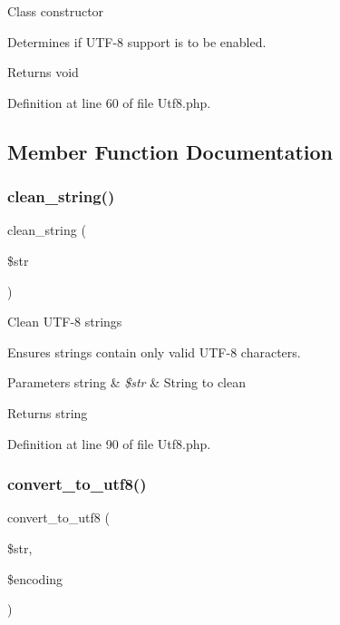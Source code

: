 Class constructor

Determines if U\+T\+F-\/8 support is to be enabled.

\begin{DoxyReturn}{Returns}
void 
\end{DoxyReturn}


Definition at line 60 of file Utf8.\+php.



\subsection{Member Function Documentation}
\mbox{\label{class_c_i___utf8_af9fc6214803042dd0b46d6ac5bdb4b7b}} 
\subsubsection{\texorpdfstring{clean\_string()}{clean\_string()}}
{\footnotesize\ttfamily clean\+\_\+string (\begin{DoxyParamCaption}\item[{}]{\$str }\end{DoxyParamCaption})}

Clean U\+T\+F-\/8 strings

Ensures strings contain only valid U\+T\+F-\/8 characters.


\begin{DoxyParams}[1]{Parameters}
string & {\em \$str} & String to clean \\
\hline
\end{DoxyParams}
\begin{DoxyReturn}{Returns}
string 
\end{DoxyReturn}


Definition at line 90 of file Utf8.\+php.

\mbox{\label{class_c_i___utf8_a7f6a8b9f00d7d11b23abcadfc91e9583}} 
\subsubsection{\texorpdfstring{convert\_to\_utf8()}{convert\_to\_utf8()}}
{\footnotesize\ttfamily convert\+\_\+to\+\_\+utf8 (\begin{DoxyParamCaption}\item[{}]{\$str,  }\item[{}]{\$encoding }\end{DoxyParamCaption})}


